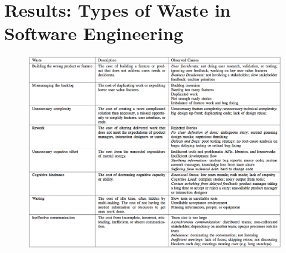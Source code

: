 \section{Results: Types of Waste in Software Engineering}
\label{SEWaste}

\begin{figure}[t]
\centering
{}
\label{Waste}
\includegraphics[width=6.4in]{software_engineering_waste/waste.png}
\end{figure}

